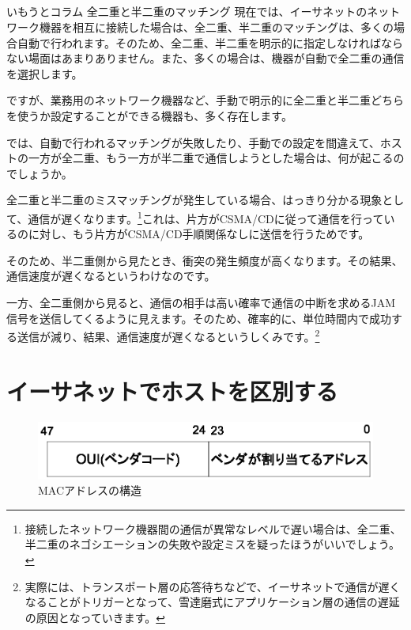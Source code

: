 \subsection*{}
\begin{itembox}[l]{いもうとコラム 全二重と半二重のマッチング}
現在では、イーサネットのネットワーク機器を相互に接続した場合は、全二重、半二重のマッチングは、多くの場合自動で行われます。そのため、全二重、半二重を明示的に指定しなければならない場面はあまりありません。また、多くの場合は、機器が自動で全二重の通信を選択します。

ですが、業務用のネットワーク機器など、手動で明示的に全二重と半二重どちらを使うか設定することができる機器も、多く存在します。

では、自動で行われるマッチングが失敗したり、手動での設定を間違えて、ホストの一方が全二重、もう一方が半二重で通信しようとした場合は、何が起こるのでしょうか。

全二重と半二重のミスマッチングが発生している場合、はっきり分かる現象として、通信が遅くなります。\footnote{接続したネットワーク機器間の通信が異常なレベルで遅い場合は、全二重、半二重のネゴシエーションの失敗や設定ミスを疑ったほうがいいでしょう。}これは、片方がCSMA/CDに従って通信を行っているのに対し、もう片方がCSMA/CD手順関係なしに送信を行うためです。

そのため、半二重側から見たとき、衝突の発生頻度が高くなります。その結果、通信速度が遅くなるというわけなのです。

一方、全二重側から見ると、通信の相手は高い確率で通信の中断を求めるJAM信号を送信してくるように見えます。そのため、確率的に、単位時間内で成功する送信が減り、結果、通信速度が遅くなるというしくみです。\footnote{実際には、トランスポート層の応答待ちなどで、イーサネットで通信が遅くなることがトリガーとなって、雪達磨式にアプリケーション層の通信の遅延の原因となっていきます。}
\end{itembox}





\section{イーサネットでホストを区別する}

\begin{figure}[htbp]
	\includegraphics[width=12cm,clip]{draw/macaddr.eps}
	\caption{MACアドレスの構造}
	\label{fig:macaddress}
\end{figure}

